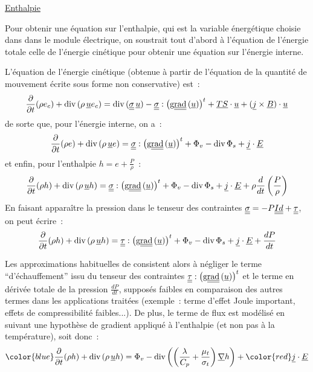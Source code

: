 \underline{Enthalpie}
\nopagebreak

Pour obtenir une équation sur l'enthalpie, qui est la variable énergétique
choisie dans \CS dans le module électrique, on
soustrait tout d'abord à l'équation de l'énergie totale celle de l'énergie
cinétique pour obtenir une équation sur l'énergie interne.

L'équation de l'énergie
cinétique (obtenue à partir de l'équation de la quantité de mouvement
écrite sous forme non conservative) est~:
\begin{equation}
\displaystyle\frac{\partial}{\partial t}(\rho e_c)
+\text{div}\,(\rho\, \underline{u} e_c)
=\text{div}\,(\underline{\underline{\sigma}}\,\underline{u}) - \underline{\underline{\sigma}}:\left(\text{g}\underline{\underline{{\text{rad}}}}\,(\underline{u})\right)^t +
\underline{TS}\cdot\underline{u} + (\underline{j} \times \underline{B})\cdot\underline{u}
\end{equation}
de sorte que, pour l'énergie interne, on a~:
\begin{equation}
\displaystyle\frac{\partial}{\partial t}(\rho e)
+\text{div}\,(\rho\, \underline{u} e)
=\underline{\underline{\sigma}}:\left(\text{g}\underline{\underline{{\text{rad}}}}\,(\underline{u})\right)^t + \Phi_v - \text{div}\,{\Phi_s} + \underline{j}\cdot \underline{E}
\end{equation}
et enfin, pour l'enthalpie $h=e+\frac{P}{\rho}$~:
\begin{equation}
\displaystyle\frac{\partial}{\partial t}(\rho h)
+\text{div}\,(\rho\, \underline{u} h)
=\underline{\underline{\sigma}}:\left(\text{g}\underline{\underline{{\text{rad}}}}\,(\underline{u})\right)^t + \Phi_v - \text{div}\,{\Phi_s} + \underline{j}\cdot \underline{E}+\rho\frac{d}{dt}\left(\frac{P}{\rho}\right)
\end{equation}
En faisant apparaître la pression dans le tenseur des contraintes
$\underline{\underline{\sigma}}=-P\underline{\underline{Id}}+\underline{\underline{\tau}}$, on peut écrire~:
\begin{equation}
\displaystyle\frac{\partial}{\partial t}(\rho h)
+\text{div}\,(\rho\, \underline{u} h)
=\underline{\underline{\tau}}:\left(\text{g}\underline{\underline{{\text{rad}}}}\,(\underline{u})\right)^t + \Phi_v - \text{div}\,{\Phi_s}
+ \underline{j}\cdot\underline{E} + \frac{dP}{dt}
\end{equation}

Les approximations habituelles de \CS consistent alors
à négliger le terme ``d'échauffement'' issu du tenseur des contraintes
$\underline{\underline{\tau}}:\left(\text{g}\underline{\underline{{\text{rad}}}}\,(\underline{u})\right)^t$ et le terme en dérivée totale de la
pression $\frac{dP}{dt}$, supposés faibles en comparaison des autres termes
dans les applications traitées (exemple~: terme d'effet Joule important, effets de
compressibilité faibles...).
De plus, le terme de flux est modélisé en suivant
une hypothèse de gradient appliqué à l'enthalpie (et non pas à la
température), soit donc~:
\begin{equation}
{\color{blue}\displaystyle\frac{\partial}{\partial t}(\rho h)
+\dive(\rho\, \vect{u} h)
=\Phi_v -
\dive{\left(\left(\frac{\lambda}{C_p}+\frac{\mu_t}{\sigma_t}\right)\grad h\right)} + {\color{red}\vect{j}\cdot\vect{E}}}
\end{equation}


